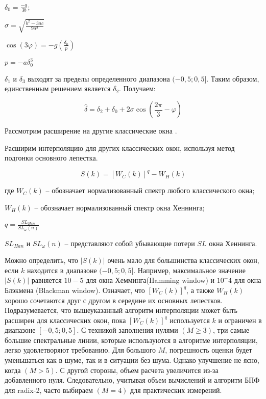 $\delta_0 = \frac{-a}{3b};$

$\sigma = \sqrt{\frac{b^2 - 3ac}{9a^2}}$

$\cos(3 \varphi) = - g \left( {\frac{\delta_0}{p}}
\right) $

$p = -a \delta_0 ^3$

$\delta_1$ и $\delta_3$ выходят за пределы определенного диапазона $(-0,5;0,5]$. Таким образом, единственным решением является $\delta_2 $. Получаем:

\begin{equation}
	\label{eq:equation59}
	\hat{\delta} = \delta_2 + \delta_0 + 2 \sigma \cos \left({\frac{2 \pi}{3} - \varphi} \right) 
\end{equation}

Рассмотрим расширение на другие классические окна .

Расширим интерполяцию для других классических окон, используя метод подгонки основного лепестка. 

\begin{equation}
	\label{eq:equation60}
	S(k) = [W_C (k)]^q - W_H (k)
\end{equation}

где $W_C (k)$ -- обозначает нормализованный спектр любого классического окна;

$W_H (k)$ -- обозначает нормализованный спектр окна Хеннинга;

$q = \frac{S L_{Han}}{S L_\omega(n)}$

$S L_{Han}$ и $S L_\omega(n)$ -- представляют собой убывающие потери $SL$ окна Хеннинга.

Можно определить, что $|S(k)|$ очень мало 
для большинства классических окон, если $k$ находится в диапазоне  $(-0,5;0,5]$. 
Например, максимальное значение $|S(k)|$ равняется $10-5$ для окна Хемминга(Hamming window) и $10^-4$ для окна Блэкмена (Blackman window).
Означает, что $[W_C (k)]^q$, а также $W_H (k)$ хорошо сочетаются друг с другом в середине их основных лепестков. 
Подразумевается, что вышеуказанный алгоритм интерполяции может быть расширен для классических окон, пока $[W_C (k)]^q$ используется $k$ и ограничен в диапазоне $[-0,5;0,5]$. 
С техникой заполнения нулями $(M\geq3)$, три самые большие спектральные линии, которые используются в алгоритме интерполяции, легко удовлетворяют требованию. Для большого $M$, погрешность оценки будет уменьшаться как в шуме, так и в ситуации без шума. Однако улучшение не ясно, когда $(M>5)$. С другой стороны, объем расчета увеличится из-за добавленного нуля. Следовательно, учитывая объем вычислений и алгоритм БПФ для radix-2, часто выбираем $(M=4)$ для практических измерений.

